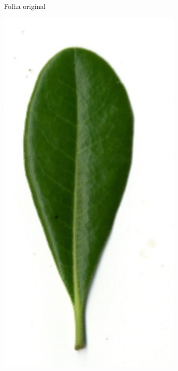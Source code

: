 \begin{figure}[htb]
\begin{subfigure}[t]{0.24\textwidth}
		\caption{Folha original}
	\end{subfigure}
	\begin{subfigure}[t]{0.24\textwidth}
		\centering
		\includegraphics[width=1\textwidth]{img/perona.jpg}

\end{subfigure}
\end{figure}
